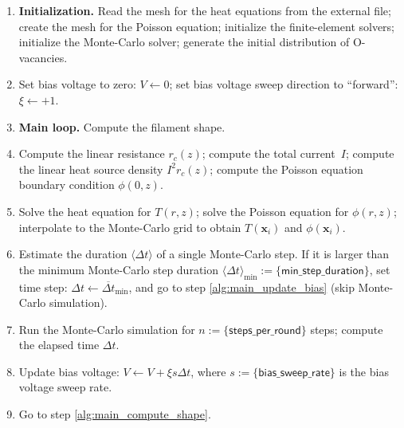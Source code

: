 \documentclass[10pt]{article}
\renewcommand{\vec}[1]{\mathbf{#1}}
\newcommand{\vx}{\vec{x}}
\begin{document}
\begin{enumerate}
\item \textbf{Initialization.} Read the mesh for the heat equations from the
external file; create the mesh for the Poisson equation; initialize the
finite-element solvers; initialize the Monte-Carlo solver; generate the initial
distribution of O-vacancies.

\item Set bias voltage to zero: $V \gets 0$; set bias voltage sweep direction to
``forward'': $\xi \gets +1$.

\item \label{alg:main_compute_shape} \textbf{Main loop.} Compute the filament
shape.

\item Compute the linear resistance $r_c(z)$; compute
the total current~$I$; compute the linear heat source density $I^2 r_c(z)$;
compute the Poisson equation boundary condition $\phi(0, z)$.

\item Solve the heat equation for $T(r, z)$; solve the Poisson equation for
$\phi(r, z)$; interpolate to the Monte-Carlo grid to obtain $T(\vx_i)$ and
$\phi(\vx_i)$.

\item Estimate the duration $\langle \Delta t \rangle$ of a single Monte-Carlo
step. If it is larger than the minimum Monte-Carlo step duration
$\langle \Delta t \rangle_{\min} := \{ \mathsf{min\_step\_duration} \}$, set
time step: $\Delta t \gets \overline{\Delta t}_{\min}$, and go to step
\ref{alg:main_update_bias} (skip Monte-Carlo simulation).

\item Run the Monte-Carlo simulation for $n := \{ \mathsf{steps\_per\_round} \}$
steps; compute the elapsed time $\Delta t$.

\item \label{alg:main_update_bias} Update bias voltage:
$V \gets V + \xi s \Delta t$, where $s := \{ \mathsf{bias\_sweep\_rate} \}$
is the bias voltage sweep rate.

\item Go to step \ref{alg:main_compute_shape}.
\end{enumerate}
\end{document}
